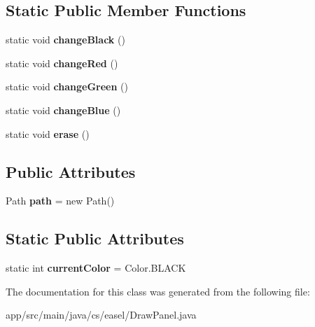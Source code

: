 \subsection*{Static Public Member Functions}
\begin{DoxyCompactItemize}
\item 
\hypertarget{classcs_1_1easel_1_1_draw_panel_a31a81adc2fb73955a02cd0ef493c3047}{static void {\bfseries change\+Black} ()}\label{classcs_1_1easel_1_1_draw_panel_a31a81adc2fb73955a02cd0ef493c3047}

\item 
\hypertarget{classcs_1_1easel_1_1_draw_panel_a69e5b44fba43cb141a9c15caf157b0ec}{static void {\bfseries change\+Red} ()}\label{classcs_1_1easel_1_1_draw_panel_a69e5b44fba43cb141a9c15caf157b0ec}

\item 
\hypertarget{classcs_1_1easel_1_1_draw_panel_a6a186bdaddc7b3a01ee299d8f54ef04a}{static void {\bfseries change\+Green} ()}\label{classcs_1_1easel_1_1_draw_panel_a6a186bdaddc7b3a01ee299d8f54ef04a}

\item 
\hypertarget{classcs_1_1easel_1_1_draw_panel_ae03cd407d8c5c15d851277f66387e5b3}{static void {\bfseries change\+Blue} ()}\label{classcs_1_1easel_1_1_draw_panel_ae03cd407d8c5c15d851277f66387e5b3}

\item 
\hypertarget{classcs_1_1easel_1_1_draw_panel_a989814529888ecb48bcd16e8110ed72e}{static void {\bfseries erase} ()}\label{classcs_1_1easel_1_1_draw_panel_a989814529888ecb48bcd16e8110ed72e}

\end{DoxyCompactItemize}
\subsection*{Public Attributes}
\begin{DoxyCompactItemize}
\item 
\hypertarget{classcs_1_1easel_1_1_draw_panel_aeb6242ff8bdae21e8ea2d0cc8ec39f74}{Path {\bfseries path} = new Path()}\label{classcs_1_1easel_1_1_draw_panel_aeb6242ff8bdae21e8ea2d0cc8ec39f74}

\end{DoxyCompactItemize}
\subsection*{Static Public Attributes}
\begin{DoxyCompactItemize}
\item 
\hypertarget{classcs_1_1easel_1_1_draw_panel_abf7cab6befdb118811b734d480d2f0e0}{static int {\bfseries current\+Color} = Color.\+B\+L\+A\+C\+K}\label{classcs_1_1easel_1_1_draw_panel_abf7cab6befdb118811b734d480d2f0e0}

\end{DoxyCompactItemize}


The documentation for this class was generated from the following file\+:\begin{DoxyCompactItemize}
\item 
app/src/main/java/cs/easel/Draw\+Panel.\+java\end{DoxyCompactItemize}
